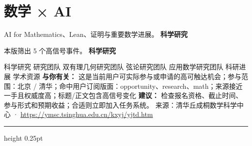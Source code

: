 \documentclass[10.5pt]{ctexart}
\begin{document}
\section*{数学 × AI}
{\color{ormuted} AI for Mathematics、Lean、证明与重要数学进展。}
\vspace{2mm}
{\LARGE\bfseries 科学研究}\par
\vspace{1mm}
{\color{ormuted} 本版筛出 5 个高信号事件。}
\vspace{3mm}
{\Large\bfseries 科学研究}\par
科学研究 研究团队 双有理几何研究团队 弦论研究团队 应用数学研究团队 科研进展 学术资源
\textbf{与你有关：} 这是当前用户可实际参与或申请的高可触达机会；参与范围：北京 / 清华；命中用户订阅版面：opportunity、research、math；来源接近一手且权威度高；标题/正文包含高信号变化
\textbf{建议：} 检查报名资格、截止时间、参与形式和预期收益；合适则立即加入任务系统。
{\footnotesize\color{ormuted} 来源：清华丘成桐数学科学中心 · \url{https://ymsc.tsinghua.edu.cn/kxyj/yjtd.htm}}
\vspace{4mm}
\hrule height 0.25pt
\vspace{3mm}
\end{document}
